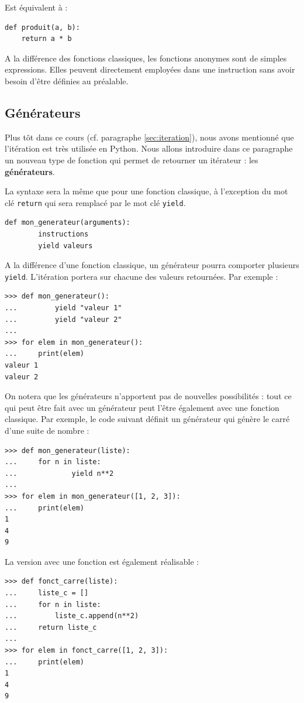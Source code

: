 \documentclass[12pt, a4paper]{article}
\begin{document}
Est équivalent à :
\begin{lstlisting}
def produit(a, b):
    return a * b
\end{lstlisting}

A la différence des fonctions classiques, les fonctions anonymes sont de simples expressions. Elles peuvent directement employées dans une instruction sans avoir besoin d'être définies au préalable.




\subsection{Générateurs}
Plus tôt dans ce cours (cf. paragraphe \ref{sec:iteration}), nous avons mentionné que l'itération est très utilisée en Python. Nous allons introduire dans ce paragraphe un nouveau type de fonction qui permet de retourner un itérateur : les \textbf{générateurs}.

La syntaxe sera la même que pour une fonction classique, à l'exception du mot clé \lstinline{return} qui sera remplacé par le mot clé \lstinline{yield}.
\begin{lstlisting}
def mon_generateur(arguments):
		instructions
		yield valeurs
\end{lstlisting}

A la différence d'une fonction classique, un générateur pourra comporter plusieurs \lstinline{yield}. L'itération portera sur chacune des valeurs retournées. Par exemple :
\begin{lstlisting}
>>> def mon_generateur():
... 		yield "valeur 1"
... 		yield "valeur 2"
...
>>> for elem in mon_generateur():
...     print(elem)
valeur 1
valeur 2
\end{lstlisting}

On notera que les générateurs n'apportent pas de nouvelles possibilités : tout ce qui peut être fait avec un générateur peut l'être également avec une fonction classique. Par exemple, le code suivant définit un générateur qui génère le carré d'une suite de nombre :
\begin{lstlisting}
>>> def mon_generateur(liste):
...	    for n in liste:
... 		    yield n**2
...
>>> for elem in mon_generateur([1, 2, 3]):
...     print(elem)
1
4
9
\end{lstlisting}

La version avec une fonction est également réalisable :
\begin{lstlisting}
>>> def fonct_carre(liste):
...     liste_c = []
...     for n in liste:
...         liste_c.append(n**2)
...     return liste_c
...
>>> for elem in fonct_carre([1, 2, 3]):
...     print(elem)
1
4
9
\end{lstlisting}
\end{document}
